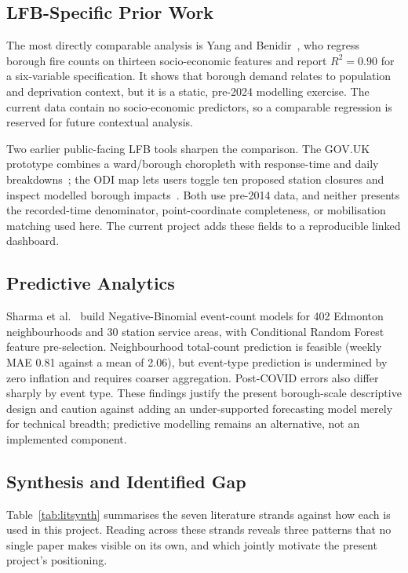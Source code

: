\subsection{LFB-Specific Prior Work}\label{sec:lit-lfb}

The most directly comparable analysis is Yang and Benidir~\cite{antoyang2020}, who regress borough fire counts on thirteen socio-economic features and report $R^2=0.90$ for a six-variable specification. It shows that borough demand relates to population and deprivation context, but it is a static, pre-2024 modelling exercise. The current data contain no socio-economic predictors, so a comparable regression is reserved for future contextual analysis.

Two earlier public-facing LFB tools sharpen the comparison. The GOV.UK prototype combines a ward/borough choropleth with response-time and daily breakdowns~\cite{govuk2014}; the ODI map lets users toggle ten proposed station closures and inspect modelled borough impacts~\cite{odi2013}. Both use pre-2014 data, and neither presents the recorded-time denominator, point-coordinate completeness, or mobilisation matching used here. The current project adds these fields to a reproducible linked dashboard.

\subsection{Predictive Analytics}\label{sec:lit-predictive}

Sharma et al.~\cite{predictive2024} build Negative-Binomial event-count models for 402 Edmonton neighbourhoods and 30 station service areas, with Conditional Random Forest feature pre-selection. Neighbourhood total-count prediction is feasible (weekly MAE 0.81 against a mean of 2.06), but event-type prediction is undermined by zero inflation and requires coarser aggregation. Post-COVID errors also differ sharply by event type. These findings justify the present borough-scale descriptive design and caution against adding an under-supported forecasting model merely for technical breadth; predictive modelling remains an alternative, not an implemented component.

\subsection{Synthesis and Identified Gap}\label{sec:lit-synthesis}

Table~\ref{tab:litsynth} summarises the seven literature strands against how each is used in this project. Reading across these strands reveals three patterns that no single paper makes visible on its own, and which jointly motivate the present project's positioning.

